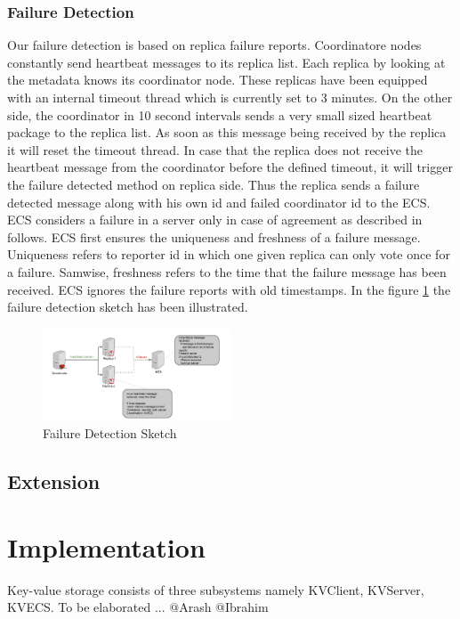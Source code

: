 \documentclass{sig-alternate}
\begin{document}
\subsubsection{Failure Detection}
Our failure detection is based on replica failure reports. Coordinatore nodes 
constantly send heartbeat messages to its replica list. Each replica by looking at the metadata knows its coordinator node. These replicas have been equipped with an internal timeout thread which is currently set to 3 minutes. On the other side, the coordinator in 10 second intervals sends a very small sized heartbeat package to the replica list. As soon as this message being received by the replica  it will reset the timeout thread. In case that the replica does not receive the heartbeat message from the coordinator before the defined timeout, it will trigger the failure   detected method on replica side. Thus the replica sends a failure detected message along with his own id and failed coordinator id to the ECS. 
ECS considers a failure in a server only in case of agreement as described in follows. ECS first ensures the uniqueness and freshness of a failure message. Uniqueness refers to reporter id in which one given replica can only vote once for a failure. Samwise, freshness refers to the time that the failure message has been received. ECS ignores the failure reports with old timestamps.
In the figure \ref{failuredetection} the failure detection sketch has been illustrated.


\begin{center}
\begin{figure}[ht!]
\centering
     \includegraphics[width=0.5\textwidth]{FailureDetection.jpg}
\caption{Failure Detection Sketch \label{failuredetection}}
\end{figure}
\end{center}

\subsection{Extension}

\section{Implementation}
Key-value storage consists of three subsystems namely KVClient, KVServer, KVECS. 
To be elaborated ... @Arash @Ibrahim
\end{document}
